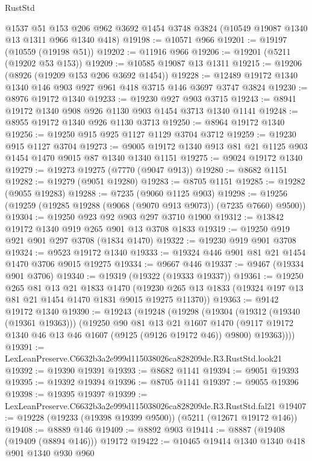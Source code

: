 \begin{lexlean}{RustStd}
\begin{coremodule}
    @1537
    @51
    @153
    @206
    @962
    @3692
    @1454
    @3748
    @3824
    (@10549 @19087 @1340 @13 @1311 @966 @1340 @418)
@19198 := @10571 @966
@19201 := @19197 (@10559 (@19198 @51))
@19202 := @11916 @966
@19206 := @19201 (@5211 (@19202 @53 @153))
@19209 := @10585 @19087 @13 @1311
@19215 := @19206 (@8926 (@19209 @153 @206 @3692 @1454))
@19228 := @12489 @19172 @1340 @1340 @146 @903 @927 @961 @418 @3715 @146 @3697 @3747 @3824
@19230 := @8976 @19172 @1340
@19233 := @19230 @927 @903 @3715
@19243 := @8941 @19172 @1340 @908 @926 @1130 @903 @1454 @3713 @1340 @1141
@19248 := @8955 @19172 @1340 @926 @1130 @3713
@19250 := @8964 @19172 @1340
@19256 := @19250 @915 @925 @1127 @1129 @3704 @3712
@19259 := @19230 @915 @1127 @3704
@19273 := @9005 @19172 @1340 @913 @81 @21 @1125 @903 @1454 @1470 @9015 @87 @1340 @1340 @1151
@19275 := @9024 @19172 @1340
@19279 := @19273 @19275 (@7770 (@9047 @913))
@19280 := @8682 @1151
@19282 := @19279 (@9051 @19280)
@19283 := @8705 @1151
@19285 := @19282 (@9055 @19283)
@19288 := @7235 (@9060 @1125 @903)
@19298 := @19256 (@19259 (@19285 @19288 (@9068 (@9070 @913 @9073)) (@7235 @7660) @9500))
@19304 := @19250 @923 @92 @903 @297 @3710 @1900
@19312 := @13842 @19172 @1340 @919 @265 @901 @13 @3708 @1833
@19319 := @19250 @919 @921 @901 @297 @3708 (@1834 @1470)
@19322 := @19230 @919 @901 @3708
@19324 := @9523 @19172 @1340
@19333 := @19324 @446 @901 @81 @21 @1454 @1470 @3706 @9015 @19275
@19334 := @9667 @446
@19337 := @9467 (@19334 @901 @3706)
@19340 := @19319 (@19322 (@19333 @19337))
@19361 := @19250
    @265
    @81
    @13
    @21
    @1833
    @1470
    (@19230 @265 @13 @1833 (@19324 @197 @13 @81 @21 @1454 @1470 @1831 @9015 @19275 @11370))
@19363 := @9142 @19172 @1340
@19390 := @19243
    (@19248
      (@19298
        (@19304
          (@19312 (@19340 (@19361 @19363)))
          (@19250
            @90
            @81
            @13
            @21
            @1607
            @1470
            (@9117 @19172 @1340 @46 @13 @46 @1607 (@9125 (@9126 @19172 @46)) @9800)
            @19363))))
@19391 := LexLeanPreserve.C6632b3a2e999d115038026ca828209de.R3.RustStd.look21
@19392 := @19390 @19391
@19393 := @8682 @1141
@19394 := @9051 @19393
@19395 := @19392 @19394
@19396 := @8705 @1141
@19397 := @9055 @19396
@19398 := @19395 @19397
@19399 := LexLeanPreserve.C6632b3a2e999d115038026ca828209de.R3.RustStd.fal21
@19407 := @19228 (@19233 (@19398 @19399 @9500)) (@5211 (@12671 @19172 @146))
@19408 := @8889 @146
@19409 := @8892 @903
@19414 := @8887 (@19408 (@19409 (@8894 @146))) @19172
@19422 := @10465 @19414 @1340 @1340 @418 @901 @1340 @930 @960

\end{coremodule}
\end{lexlean}
